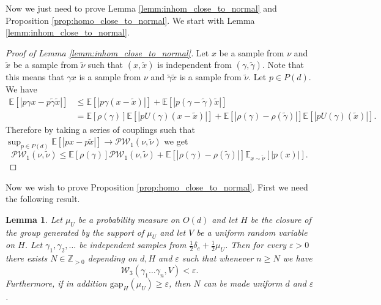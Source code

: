 \documentclass[10pt, english,oneside,reqno]{amsart}
\theoremstyle{plain}
\newtheorem{lemma}[theorem]{Lemma}
\theoremstyle{remark}
\numberwithin{equation}{section}
\numberwithin{figure}{section}
\newcommand{\eps}{\varepsilon}
\newcommand{\Z}{\mathbb{Z}}
\begin{document}
Now we just need to prove Lemma \ref{lemm:inhom_close_to_normal} and Proposition \ref{prop:homo_close_to_normal}. We start with Lemma \ref{lemm:inhom_close_to_normal}.

\begin{proof}[Proof of Lemma \ref{lemm:inhom_close_to_normal}]
    Let $x$ be a sample from $\nu$ and $\tilde{x}$ be a sample from $\tilde{\nu}$ such that $(x, \tilde{x})$ is independent from $(\gamma, \tilde{\gamma})$. Note that this means that $\gamma x$ is a sample from $\nu$ and $\tilde{\gamma} \tilde{x}$ is a sample from $\tilde{\nu}$. Let $p \in P(d)$. We have
	\begin{align*}
		\mathbb{E}[| p \gamma x - p \tilde{\gamma} \tilde{x} |] &\leq \mathbb{E}[| p \gamma(x - \tilde{x})|] + \mathbb{E}[| p (\gamma - \tilde{\gamma}) \tilde{x} |] \\
		& = \mathbb{E}[\rho(\gamma)] \mathbb{E}[| p U(\gamma) (x - \tilde{x})|] + \mathbb{E}[|\rho(\gamma) - \rho(\tilde{\gamma})|] \mathbb{E}[| p U(\gamma) (\tilde{x})|].
	\end{align*}
	Therefore by taking a series of couplings such that $\sup_{p \in P(d)} \mathbb{E}[|px - p\tilde{x}|] \to \mathcal{PW}_1(\nu, \tilde{\nu})$ we get
	\begin{equation*}
		\mathcal{PW}_1(\nu, \tilde{\nu}) \leq \mathbb{E}[\rho(\gamma)] \mathcal{PW}_1(\nu, \tilde{\nu}) + \mathbb{E}[|\rho(\gamma) - \rho(\tilde{\gamma})|] \mathbb{E}_{x \sim \tilde{\nu}}[|p(x)|].
	\end{equation*}
\end{proof}

Now we wish to prove Proposition \ref{prop:homo_close_to_normal}. First we need the following result.

\begin{lemma} \label{lemma:dense_tends_to_haar}
    Let $\mu_U$ be a probability measure on $O(d)$ and let $H$ be the closure of the group generated by the support of $\mu_U$ and let $V$ be a uniform random variable on $H$. Let $\gamma_1, \gamma_2, \dots$ be independent samples from $\frac{1}{2}\delta_e + \frac{1}{2}\mu_U$. Then for every $\varepsilon > 0$ there exists $N \in \Z_{>0}$ depending on $d,H$ and $\eps$ such that whenever $n \geq N$ we have
	\begin{equation*}
		\mathcal{W}_3(\gamma_1 \dots \gamma_n, V) < \varepsilon.
	\end{equation*}
		Furthermore, if in addition $\mathrm{gap}_{H}(\mu_U) \geq \eps$, then $N$ can be made uniform $d$ and $\varepsilon$.
\end{lemma}
\end{document}
